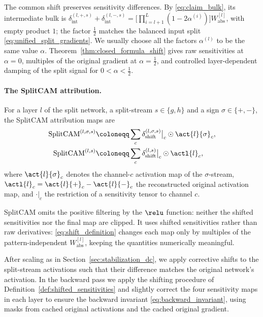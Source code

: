 The common shift preserves sensitivity differences. By \eqref{eq:claim_bulk}, its intermediate bulk is $\delta_{\mathrm{int}}^{(l,+,s)}+\delta_{\mathrm{int}}^{(l,-,s)}=\bigl[\prod_{i=l+1}^L(1-2\alpha^{(i)})\bigr]W_{\mathrm{abs}}^{[l]}$, with empty product $1$; the factor $\tfrac12$ matches the balanced input split \eqref{eq:unified_split_gradients}. We usually choose all the factors $\alpha^{(l)}$ to be the same value $\alpha$. Theorem~\ref{thm:closed_formula_shift} gives raw sensitivities at $\alpha=0$, multiples of the original gradient at $\alpha=\tfrac12$, and controlled layer-dependent damping of the split signal for $0<\alpha<\tfrac12$.

\paragraph{The SplitCAM attribution.}\label{subsec:splitcam_definition}
\begin{definition}[SplitCAM]\label{def:splitcam}
For a layer $l$ of the split network, a split-stream $s \in \{g, h\}$ and a sign $\sigma \in \{+, -\}$, the SplitCAM attribution maps are
\begin{align}
	\text{SplitCAM}^{(l, \sigma, s)} &\coloneqq \sum_{c} \delta_{\mathrm{shift}}^{(l, \sigma, s)}\big\vert_c \odot \act{l}{\sigma}_c,
	\label{eq:splitcam_stream} \\
	\text{SplitCAM}^{(l, s)} &\coloneqq \sum_{c} \delta_{\mathrm{shift}}^{(l, s)}\big\vert_c \odot \actl{l}_c,
	\label{eq:splitcam_combined}
\end{align}
where $\act{l}{\sigma}_c$ denotes the channel-$c$ activation map of the $\sigma$-stream, $\actl{l}_c = \act{l}{+}_c - \act{l}{-}_c$ the reconstructed original activation map, and $\cdot\vert_c$ the restriction of a sensitivity tensor to channel $c$.
\end{definition}

SplitCAM omits the positive filtering by the $\relu$ function: neither the shifted sensitivities nor the final map are clipped. It uses shifted sensitivities rather than raw derivatives: \eqref{eq:shift_definition} changes each map only by multiples of the pattern-independent $W_{\mathrm{abs}}^{[l]}$, keeping the quantities numerically meaningful.

After scaling as in Section~\ref{sec:stabilization_dc}, we apply corrective shifts to the split-stream activations such that their difference matches the original network's activation. In the backward pass we apply the shifting procedure of Definition~\ref{def:shifted_sensitivities} and slightly correct the four sensitivity maps in each layer to ensure the backward invariant \eqref{eq:backward_invariant}, using masks from cached original activations and the cached original gradient.

